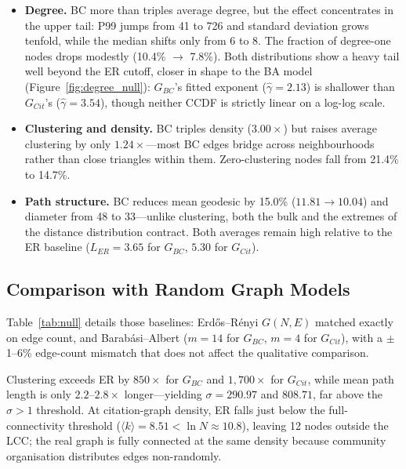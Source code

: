 \begin{itemize}
  \item \textbf{Degree.} BC more than triples average degree, but the effect concentrates in the upper tail: P99 jumps from 41 to 726 and standard deviation grows tenfold, while the median shifts only from 6 to 8. The fraction of degree-one nodes drops modestly (10.4\% $\to$ 7.8\%). Both distributions show a heavy tail well beyond the ER cutoff, closer in shape to the BA model (Figure~\ref{fig:degree_null}): $G_{BC}$'s fitted exponent ($\hat{\gamma}=2.13$) is shallower than $G_{Cit}$'s ($\hat{\gamma}=3.54$), though neither CCDF is strictly linear on a log-log scale.

  \item \textbf{Clustering and density.} BC triples density ($3.00\times$) but raises average clustering by only $1.24\times$---most BC edges bridge across neighbourhoods rather than close triangles within them. Zero-clustering nodes fall from 21.4\% to 14.7\%.

  \item \textbf{Path structure.} BC reduces mean geodesic by 15.0\% ($11.81 \to 10.04$) and diameter from 48 to 33---unlike clustering, both the bulk and the extremes of the distance distribution contract. Both averages remain high relative to the ER baseline ($L_{ER} = 3.65$ for $G_{BC}$, $5.30$ for $G_{Cit}$).
\end{itemize}

\subsection{Comparison with Random Graph Models}\label{sec:null}

Table~\ref{tab:null} details those baselines: Erd\H{o}s--R\'enyi $G(N,E)$ matched exactly on edge count, and Barab\'asi--Albert ($m=14$ for $G_{BC}$, $m=4$ for $G_{Cit}$), with a $\pm$1--6\% edge-count mismatch that does not affect the qualitative comparison.

Clustering exceeds ER by $850\times$ for $G_{BC}$ and $1{,}700\times$ for $G_{Cit}$, while mean path length is only $2.2$--$2.8\times$ longer---yielding $\sigma = 290.97$ and $808.71$, far above the $\sigma > 1$ threshold. At citation-graph density, ER falls just below the full-connectivity threshold ($\langle k \rangle = 8.51 < \ln N \approx 10.8$), leaving 12 nodes outside the LCC; the real graph is fully connected at the same density because community organisation distributes edges non-randomly.


